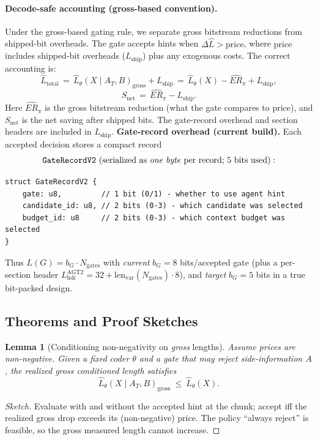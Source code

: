 \documentclass[12pt,a4paper]{article}
\newtheorem{lemma}{Lemma}
\begin{document}
\paragraph{Decode-safe accounting (gross-based convention).}
Under the gross-based gating rule, we separate gross bitstream reductions from shipped-bit overheads. The gate accepts hints when $\Delta\widehat{L}>\mathrm{price}$, where $\mathrm{price}$ includes shipped-bit overheads ($L_{\mathrm{ship}}$) plus any exogenous costs. The correct accounting is:
\begin{equation}
\widehat{L}_{\text{total}} \,=\, \widehat{L}_\theta(X\mid A_T,B)_{\mathrm{gross}} + L_{\mathrm{ship}} \,=\, \widehat{L}_\theta(X) - \widehat{ER}_\pi + L_{\mathrm{ship}},
\end{equation}
\begin{equation}
S_{\text{net}} \,=\, \widehat{ER}_\pi - L_{\mathrm{ship}}.
\end{equation}
Here $\widehat{ER}_\pi$ is the gross bitstream reduction (what the gate compares to $\mathrm{price}$), and $S_{\text{net}}$ is the net saving after shipped bits. The gate-record overhead and section headers are included in $L_{\mathrm{ship}}$.
\textbf{Gate-record overhead (current build).} Each accepted decision stores a compact record
\[
\texttt{GateRecordV2}\ (\text{serialized as \emph{one byte} per record; 5 bits used}):
\]
\begin{verbatim}
struct GateRecordV2 {
    gate: u8,         // 1 bit (0/1) - whether to use agent hint
    candidate_id: u8, // 2 bits (0-3) - which candidate was selected
    budget_id: u8     // 2 bits (0-3) - which context budget was selected
}
\end{verbatim}
Thus $L(G)=b_G\cdot N_{\text{gates}}$ with \emph{current} $b_G=8$ bits/accepted gate (plus a per-section header $L_{\mathrm{hdr}}^{\mathrm{AGT2}}=32 + \mathrm{len}_{\mathrm{var}}(N_{\text{gates}})\cdot 8$), and \emph{target} $b_G=5$ bits in a true bit-packed design.

\subsection{Theorems and Proof Sketches}
\begin{lemma}[Conditioning non-negativity on \emph{gross} lengths]
\label{lem:nonneg}
Assume prices are non-negative. Given a fixed coder $\theta$ and a gate that may reject side-information $A$, the realized \emph{gross} conditioned length satisfies
\[
\widehat{L}_\theta(X\mid A_T,B)_{\mathrm{gross}}\ \le\ \widehat{L}_\theta(X).
\]
\end{lemma}
\begin{proof}[Sketch]
Evaluate with and without the accepted hint at the chunk; accept iff the realized gross drop exceeds its (non-negative) price. The policy ``always reject'' is feasible, so the gross measured length cannot increase.
\end{proof}
\end{document}
